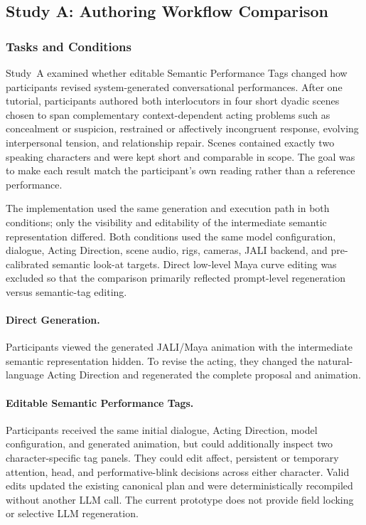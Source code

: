 \subsection{Study A: Authoring Workflow Comparison}

\subsubsection{Tasks and Conditions}

Study~A examined whether editable Semantic Performance Tags changed how participants revised system-generated conversational performances. After one tutorial, participants authored both interlocutors in four short dyadic scenes chosen to span complementary context-dependent acting problems such as concealment or suspicion, restrained or affectively incongruent response, evolving interpersonal tension, and relationship repair. Scenes contained exactly two speaking characters and were kept short and comparable in scope. The goal was to make each result match the participant's own reading rather than a reference performance.

The implementation used the same generation and execution path in both conditions; only the visibility and editability of the intermediate semantic representation differed. Both conditions used the same model configuration, dialogue, Acting Direction, scene audio, rigs, cameras, JALI backend, and pre-calibrated semantic look-at targets. Direct low-level Maya curve editing was excluded so that the comparison primarily reflected prompt-level regeneration versus semantic-tag editing.

\paragraph{Direct Generation.}
Participants viewed the generated JALI/Maya animation with the intermediate semantic representation hidden. To revise the acting, they changed the natural-language Acting Direction and regenerated the complete proposal and animation.

\paragraph{Editable Semantic Performance Tags.}
Participants received the same initial dialogue, Acting Direction, model configuration, and generated animation, but could additionally inspect two character-specific tag panels. They could edit affect, persistent or temporary attention, head, and performative-blink decisions across either character. Valid edits updated the existing canonical plan and were deterministically recompiled without another LLM call. The current prototype does not provide field locking or selective LLM regeneration.

